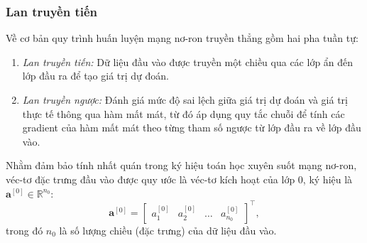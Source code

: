 \subsubsection{Lan truyền tiến}
Về cơ bản quy trình huấn luyện mạng nơ-ron truyền thẳng gồm hai pha tuần tự: 
\begin{enumerate}
    \item \textit{Lan truyền tiến:} Dữ liệu đầu vào được truyền một chiều qua các lớp ẩn đến lớp đầu ra để tạo giá trị dự đoán.
    
    \item \textit{Lan truyền ngược:} Đánh giá mức độ sai lệch giữa giá trị dự đoán và giá trị thực tế thông qua hàm mất mát, từ đó áp dụng quy tắc chuỗi để tính các gradient của hàm mất mát theo từng tham số ngược từ lớp đầu ra về lớp đầu vào.
\end{enumerate}

Nhằm đảm bảo tính nhất quán trong ký hiệu toán học xuyên suốt mạng nơ-ron, véc-tơ đặc trưng đầu vào được quy ước là véc-tơ kích hoạt của lớp $0$, ký hiệu là $\mathbf{a}^{[0]} \in \mathbb{R}^{n_0}$:
\begin{equation}
    \mathbf{a}^{[0]} = \begin{bmatrix} a_1^{[0]} & a_2^{[0]} & \dots & a_{n_0}^{[0]} \end{bmatrix}^\top,
\end{equation}
trong đó $n_0$ là số lượng chiều (đặc trưng) của dữ liệu đầu vào.

